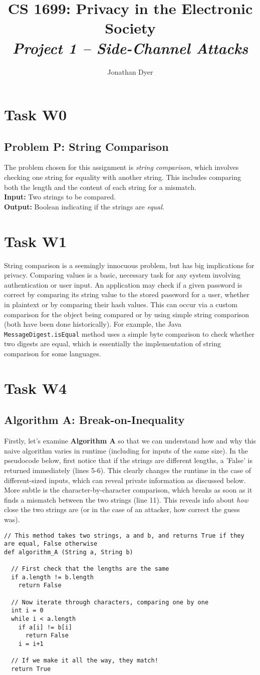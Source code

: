 \documentclass{article}
\author{Jonathan Dyer}
\title{CS 1699: Privacy in the Electronic Society \\
        \textit{Project 1 -- Side-Channel Attacks}}
\providecommand{\task}[1]{\section*{Task #1}}
\providecommand{\inlinecode}{\texttt}
\begin{document}
\maketitle
\task{W0}
\subsection*{Problem P: String Comparison}
The problem chosen for this assignment is \textit{string comparison}, which involves checking one string for equality with another string.
This includes comparing both the length and the content of each string for a mismatch. \\
\textbf{Input:  } Two strings to be compared. \\
\textbf{Output: } Boolean indicating if the strings are \textit{equal}.

\task{W1}
String comparison is a seemingly innocuous problem, but has big implications for privacy. Comparing values is a basic, necessary task for any system involving authentication or user input.
An application may check if a given password is correct by comparing its string value to the stored password for a user, whether in plaintext or by comparing their hash values.
This can occur via a custom comparison for the object being compared or by using simple string comparison (both have been done historically). For example, the Java \inlinecode{MessageDigest.isEqual} method uses a simple byte comparison to check whether two digests are equal, which is essentially the implementation of string comparison for some languages.

\task{W4}
\subsection*{Algorithm A: Break-on-Inequality}
Firstly, let's examine \textbf{Algorithm A} so that we can understand how and why this naive algorithm varies in runtime (including for inputs of the same size).
In the pseudocode below, first notice that if the strings are different lengths, a 'False' is returned immediately (lines 5-6).
This clearly changes the runtime in the case of different-sized inputs, which can reveal private information as discussed below.
More subtle is the character-by-character comparison, which breaks as soon as it finds a mismatch between the two strings (line 11). This reveals info about \textit{how} close the two strings are (or in the case of an attacker, how correct the guess was).

\begin{lstlisting}
// This method takes two strings, a and b, and returns True if they are equal, False otherwise
def algorithm_A (String a, String b)

  // First check that the lengths are the same
  if a.length != b.length
    return False

  // Now iterate through characters, comparing one by one
  int i = 0
  while i < a.length
    if a[i] != b[i]
      return False
    i = i+1

  // If we make it all the way, they match!
  return True
\end{lstlisting}
\end{document}
